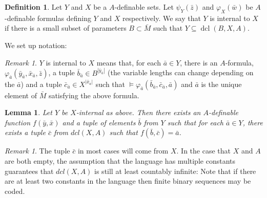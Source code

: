 \documentclass{amsart}
\newtheorem{lemma}[theorem]{Lemma}
\theoremstyle{definition}
\newtheorem{definition}[theorem]{Definition}
\theoremstyle{remark}
\newtheorem{remark}[theorem]{Remark}
\numberwithin{equation}{section}
\def \dcl {\operatorname{dcl}}
\begin{document}

\begin{definition}\label{internality}
Let $Y$ and $X$ be a $A$-definable sets. Let $\psi_Y(\bar{z})$ and $\varphi_X(\bar{w})$ be $A$-definable formulas defining $Y$ and $X$ respectively.  We say that $Y$ is internal to $X$ if there is a small subset of parameters $B \subset \bar{M}$ such that $Y \subseteq \dcl(B,X,A)$. 
\end{definition}

We set up notation:

\begin{remark}
     $Y$ is internal to $X$ means that, for each $\bar{a} \in Y$, there is an $A$-formula, $\varphi_{\bar{a}}(\bar{y}_{\bar{a}},\bar{x}_{\bar{a}},\bar{z})$, a tuple $\bar{b}_{\bar{a}} \in B^{|\bar{y}_{\bar{a}}|}$ (the variable lengths can change depending on the $\bar{a}$) and a tuple $\bar{c}_{\bar{a}} \in X^{|\bar{x}_a|}$ such that $\models \varphi_{\bar{a}}(\bar{b}_{\bar{a}},\bar{c}_{\bar{a}},\bar{a})$ and $\bar{a}$ is the unique element of $\bar{M}$ satisfying the above formula.
\end{remark}
 

\begin{lemma}\label{Y definability lemma}
Let $Y$ be $X$-internal as above. Then there exists an $A$-definable function $f(\bar{y},\bar{x})$ and a tuple of elements $\bar{b}$ from $Y$ such that for each $\bar{a} \in Y$, there exists a tuple $\bar{c}$ from $dcl(X,A)$ such that $f(\bar{b},\bar{c}) = \bar{a}$. 
\end{lemma} 

\begin{remark}
The tuple $\bar{c}$ in most cases will come from $X$. In the case that $X$ and $A$ are both empty, the assumption that the language has multiple constants guarantees that $dcl(X,A)$ is still at least countably infinite: Note that if there are at least two constants in the language then finite binary sequences may be coded.
\end{remark}
\end{document}
